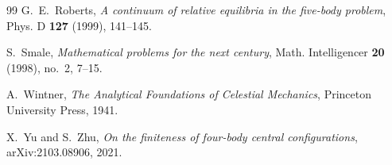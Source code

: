 \documentclass[11pt]{amsart}
\theoremstyle{definition}
\theoremstyle{remark}
\begin{document}
\begin{thebibliography}{99}
G.~E.~Roberts, \emph{A continuum of relative equilibria in the five-body problem}, Phys. D
\textbf{127} (1999), 141--145.

S.~Smale, \emph{Mathematical problems for the next century}, Math. Intelligencer \textbf{20}
(1998), no.~2, 7--15.

A.~Wintner, \emph{The Analytical Foundations of Celestial Mechanics}, Princeton University
Press, 1941.

X.~Yu and S.~Zhu, \emph{On the finiteness of four-body central configurations},
arXiv:2103.08906, 2021.

\end{thebibliography}
\end{document}
